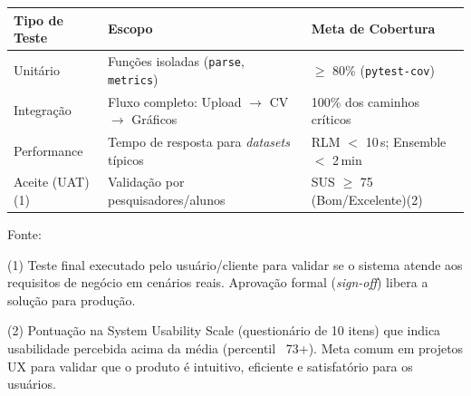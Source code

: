 \begin{quadro}[ht]
\begin{center}
\small
\captionsetup{justification=centering, labelsep=endash, width=0.75\linewidth}
\caption{Estratégia de testes e critérios de aceite}
\label{quadro:testes}
\begin{threeparttable}
\begin{tabularx}{\textwidth}{|l|X|X|} \hline
\textbf{Tipo de Teste} & \textbf{Escopo} & \textbf{Meta de Cobertura} \\ \hline
Unitário & Funções isoladas (\texttt{parse}, \texttt{metrics}) & $\geq$ 80\% (\texttt{pytest-cov}) \\ \hline
Integração & Fluxo completo: Upload $\rightarrow$ CV $\rightarrow$ Gráficos & 100\% dos caminhos críticos \\ \hline
Performance & Tempo de resposta para \textit{datasets} típicos & RLM $<$ 10\,s; Ensemble $<$ 2\,min \\ \hline
Aceite (UAT)(1) & Validação por pesquisadores/alunos & SUS $\geq$ 75 (Bom/Excelente)(2) \\ \hline
\end{tabularx}
\begin{tablenotes}[flushleft]
\item \footnotesize{Fonte:~\oautor}
\item (1) Teste final executado pelo usuário/cliente para validar se o sistema atende aos requisitos de negócio em cenários reais. Aprovação formal (\textit{sign-off}) libera a solução para produção.
\item (2) Pontuação na System Usability Scale (questionário de 10 itens) que indica usabilidade percebida acima da média (percentil ~73+). Meta comum em projetos UX para validar que o produto é intuitivo, eficiente e satisfatório para os usuários.
\end{tablenotes}
\end{threeparttable}
\end{center}
\end{quadro}

